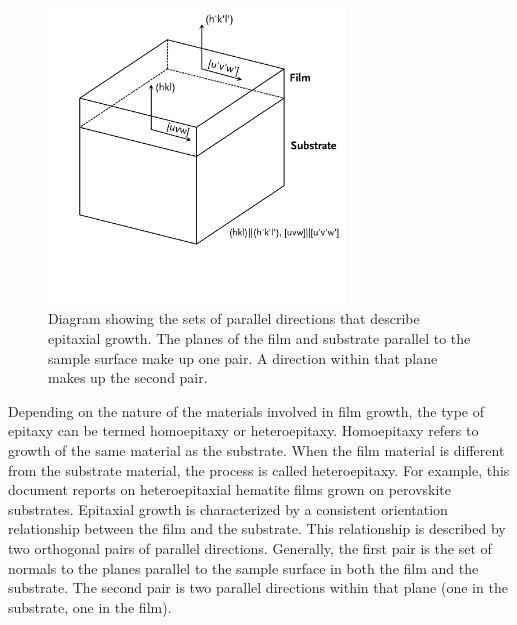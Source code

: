\begin{figure}
\begin{center}
\includegraphics[width=0.7\textwidth]{epitaxy.pdf}
\caption[Orientation relationships in epitaxy]{%
	Diagram showing the sets of parallel directions that describe epitaxial 
	growth. The planes of the film and substrate parallel to the sample surface
	make up one pair. A direction within that plane makes up the second pair. }
\label{fig:epitaxy}
\end{center}
\end{figure}
Depending on the nature of the materials involved in film growth, the type of epitaxy can
be termed homoepitaxy or heteroepitaxy. Homoepitaxy refers to growth of the same material
as the substrate. When the film material is different from the substrate material, the
process is called heteroepitaxy. For example, this document reports on heteroepitaxial
hematite films grown on perovskite substrates. Epitaxial growth is characterized by a
consistent orientation relationship between the film and the substrate. This relationship
is described by two orthogonal pairs of parallel directions. Generally, the first pair is
the set of normals to the planes parallel to the sample surface in both the film and the
substrate. The second pair is two parallel directions within that plane (one in the
substrate, one in the film). 

